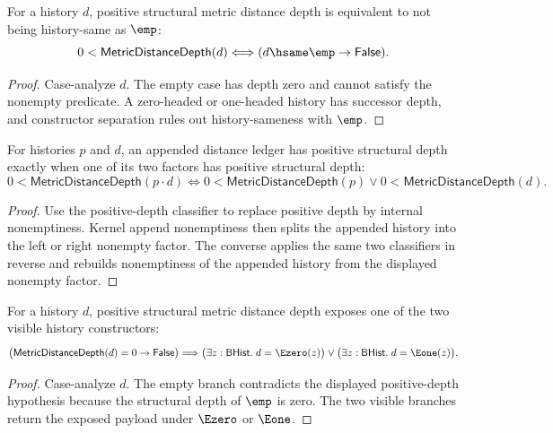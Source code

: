 \begin{theorem}
\label{thm:metric-distance-depth-positive-iff-nonempty}
For a history $d$, positive structural metric distance depth is equivalent to
not being history-same as $\emp$:
$$
0<\mathsf{MetricDistanceDepth}(d)
\Longleftrightarrow
(d\hsame\emp\to\mathsf{False}).
$$
\end{theorem}
\begin{proof}
Case-analyze $d$. The empty case has depth zero and cannot satisfy the
nonempty predicate. A zero-headed or one-headed history has successor depth,
and constructor separation rules out history-sameness with $\emp$.
\end{proof}

\begin{theorem}
\label{thm:metric-distance-depth-append-positive-iff}
For histories $p$ and $d$, an appended distance ledger has positive structural
depth exactly when one of its two factors has positive structural depth:
$$
0<\mathsf{MetricDistanceDepth}(p\cdot d)
\Longleftrightarrow
0<\mathsf{MetricDistanceDepth}(p)\vee
0<\mathsf{MetricDistanceDepth}(d).
$$
\end{theorem}
\begin{proof}
Use the positive-depth classifier to replace positive depth by internal
nonemptiness. Kernel append nonemptiness then splits the appended history into
the left or right nonempty factor. The converse applies the same two
classifiers in reverse and rebuilds nonemptiness of the appended history from
the displayed nonempty factor.
\end{proof}

\begin{theorem}
\label{thm:metric-distance-depth-positive-shape-cases}
For a history $d$, positive structural metric distance depth exposes one of
the two visible history constructors:
$$
\bigl(\mathsf{MetricDistanceDepth}(d)=0\to\mathsf{False}\bigr)
\Longrightarrow
\bigl(\exists z:\mathsf{BHist}.\;d=\Ezero(z)\bigr)\vee
\bigl(\exists z:\mathsf{BHist}.\;d=\Eone(z)\bigr).
$$
\end{theorem}
\begin{proof}
Case-analyze $d$. The empty branch contradicts the displayed positive-depth
hypothesis because the structural depth of $\emp$ is zero. The two visible
branches return the exposed payload under $\Ezero$ or $\Eone$.
\end{proof}

